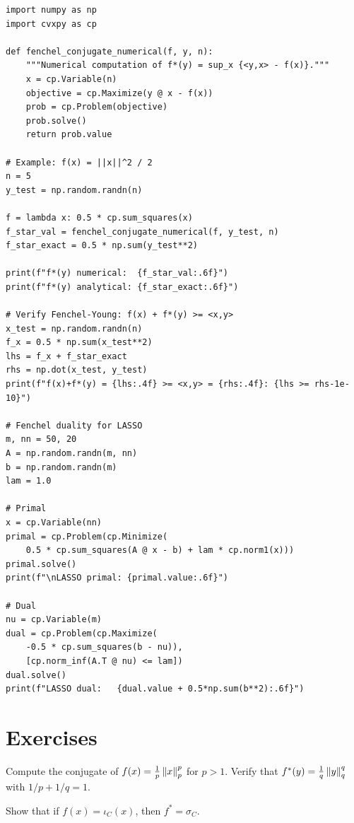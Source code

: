 \begin{codeblock}[title=\textbf{Computing conjugates and verifying Fenchel--Young}]
\begin{verbatim}
import numpy as np
import cvxpy as cp

def fenchel_conjugate_numerical(f, y, n):
    """Numerical computation of f*(y) = sup_x {<y,x> - f(x)}."""
    x = cp.Variable(n)
    objective = cp.Maximize(y @ x - f(x))
    prob = cp.Problem(objective)
    prob.solve()
    return prob.value

# Example: f(x) = ||x||^2 / 2
n = 5
y_test = np.random.randn(n)

f = lambda x: 0.5 * cp.sum_squares(x)
f_star_val = fenchel_conjugate_numerical(f, y_test, n)
f_star_exact = 0.5 * np.sum(y_test**2)

print(f"f*(y) numerical:  {f_star_val:.6f}")
print(f"f*(y) analytical: {f_star_exact:.6f}")

# Verify Fenchel-Young: f(x) + f*(y) >= <x,y>
x_test = np.random.randn(n)
f_x = 0.5 * np.sum(x_test**2)
lhs = f_x + f_star_exact
rhs = np.dot(x_test, y_test)
print(f"f(x)+f*(y) = {lhs:.4f} >= <x,y> = {rhs:.4f}: {lhs >= rhs-1e-10}")

# Fenchel duality for LASSO
m, nn = 50, 20
A = np.random.randn(m, nn)
b = np.random.randn(m)
lam = 1.0

# Primal
x = cp.Variable(nn)
primal = cp.Problem(cp.Minimize(
    0.5 * cp.sum_squares(A @ x - b) + lam * cp.norm1(x)))
primal.solve()
print(f"\nLASSO primal: {primal.value:.6f}")

# Dual
nu = cp.Variable(m)
dual = cp.Problem(cp.Maximize(
    -0.5 * cp.sum_squares(b - nu)),
    [cp.norm_inf(A.T @ nu) <= lam])
dual.solve()
print(f"LASSO dual:   {dual.value + 0.5*np.sum(b**2):.6f}")
\end{verbatim}
\end{codeblock}

\section{Exercises}

\begin{exercise}[$\star$]
Compute the conjugate of $f(x) = \frac{1}{p}\left\| x \right\|_p^p$ for $p > 1$. Verify that
$f^*(y) = \frac{1}{q}\left\| y \right\|_q^q$ with $1/p + 1/q = 1$.
\end{exercise}

\begin{exercise}[$\star$]
Show that if $f(x) = \iota_C(x)$, then $f^* = \sigma_C$.
\end{exercise}

